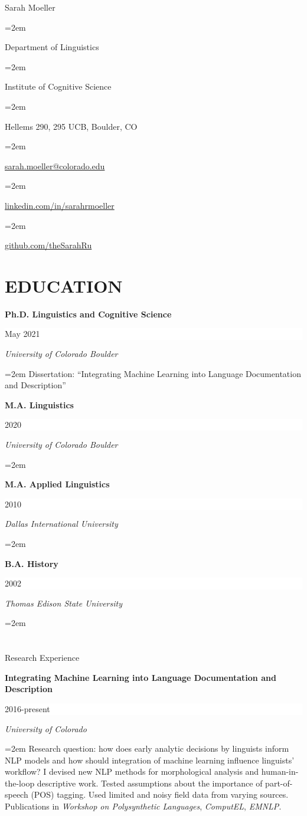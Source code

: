 \documentclass[paper=a4,fontsize=11pt]{article} %
\newlength{\spacebox}
\newcommand{\sepspace}{\vspace*{1em}}		%
\newcommand{\MyName}[1]{ %
		\Huge \usefont{OT1}{phv}{b}{n} \hfill #1
		\par \normalsize \normalfont}
\newcommand{\MySlogan}[1]{ %
		\large \usefont{OT1}{phv}{m}{n}\hfill \textit{#1}
		\par \normalsize \normalfont}
\newcommand{\NewPart}[1]{\section*{\uppercase{#1}}}
\newcommand{\PersonalEntry}[2]{
		\hangindent=2em\hangafter=0 %
		\hspace*{\fill}
		\parbox{\spacebox}{        %
		\textit{#1}}		       %
		\hspace{1.5em} #2 \par}    %
\newcommand{\EducationEntry}[4]{
		\noindent \textbf{#1} \hfill      %
		\colorbox{White}{%
			\parbox{6em}{%
			\hfill\color{Black}#2}} \par  %
		\noindent \textit{#3} \par        %
		\noindent\hangindent=2em\hangafter=0 \small #4 %
		\normalsize \par}
\newcommand{\WorkEntry}[4]{				  %
		\noindent \textbf{#1} \hfill      %
		\colorbox{White}{%
			\parbox{6em}{%
			\hfill\color{Black}#2}} \par  %
		\noindent \textit{#3} \par              %
		\noindent\hangindent=2em\hangafter=0 \small #4 %
		\normalsize \par}
\begin{document}
\thispagestyle{empty}

\MyName{Sarah Moeller}

\sepspace


\PersonalEntry{}{Department of Linguistics}
\PersonalEntry{}{Institute of Cognitive Science}
\PersonalEntry{}{Hellems 290, 295 UCB, Boulder, CO}
\PersonalEntry{}{\url{sarah.moeller@colorado.edu}}
\PersonalEntry{}{\url{linkedin.com/in/sarahrmoeller}}
\PersonalEntry{}{\url{github.com/theSarahRu}}
\sepspace

\NewPart{Education}{}

\EducationEntry{Ph.D. Linguistics and Cognitive Science}{May 2021}{University of Colorado Boulder}{Dissertation: ``Integrating Machine Learning into Language Documentation and Description''}
\sepspace


\EducationEntry{M.A. Linguistics}{2020}{University of Colorado Boulder}
\vspace{}

\EducationEntry{M.A. Applied Linguistics}{2010}{Dallas International University}
\vspace{}

\EducationEntry{B.A. History}{2002}{Thomas Edison State University}

\NewPart{Research Experience}{}

\WorkEntry{Integrating Machine Learning into Language Documentation and Description}{2016-present}{University of Colorado}{Research question: how does early analytic decisions by linguists inform NLP models and how should integration of machine learning influence linguists' workflow? I devised new NLP methods for morphological analysis and human-in-the-loop descriptive work. Tested assumptions about the importance of part-of-speech (POS) tagging. Used limited and noisy field data from varying sources. 
Publications in 
\textit{Workshop on Polysynthetic Languages}, \textit{ComputEL}, \textit{EMNLP}.
}
\sepspace
\end{document}

